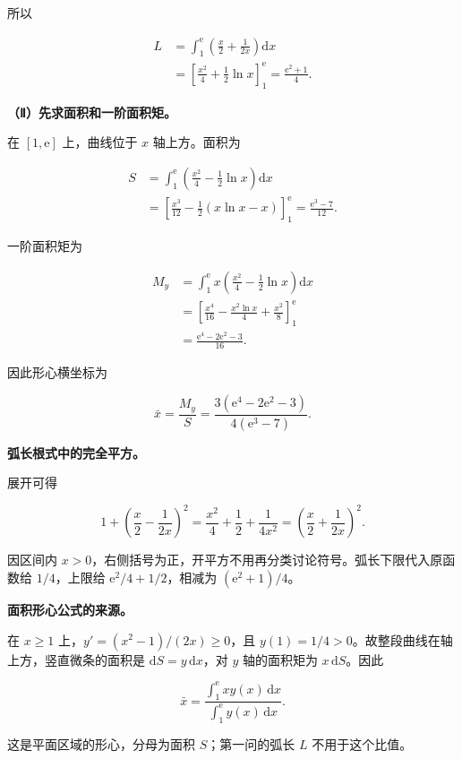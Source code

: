 \documentclass[UTF8,11pt,fontset=windows]{ctexart}
\begin{document}
所以

$$
\begin{aligned}
L&=\int_1^{\mathrm e}\left(\frac x2+\frac1{2x}\right)\mathrm dx\\
&=\left[\frac{x^2}{4}+\frac12\ln x\right]_1^{\mathrm e}
=\frac{\mathrm e^2+1}{4}.
\end{aligned}
$$

\textbf{（Ⅱ）先求面积和一阶面积矩。}

在 $[1,\mathrm e]$ 上，曲线位于 $x$ 轴上方。面积为

$$
\begin{aligned}
S&=\int_1^{\mathrm e}\left(\frac{x^2}{4}-\frac12\ln x\right)\mathrm dx\\
&=\left[\frac{x^3}{12}-\frac12(x\ln x-x)\right]_1^{\mathrm e}
=\frac{\mathrm e^3-7}{12}.
\end{aligned}
$$

一阶面积矩为

$$
\begin{aligned}
M_y&=\int_1^{\mathrm e}x\left(\frac{x^2}{4}-\frac12\ln x\right)\mathrm dx\\
&=\left[\frac{x^4}{16}-\frac{x^2\ln x}{4}+\frac{x^2}{8}\right]_1^{\mathrm e}\\
&=\frac{\mathrm e^4-2\mathrm e^2-3}{16}.
\end{aligned}
$$

因此形心横坐标为

$$
\bar x=\frac{M_y}{S}
=\frac{3(\mathrm e^4-2\mathrm e^2-3)}{4(\mathrm e^3-7)}.
$$

\textbf{弧长根式中的完全平方。}

展开可得

$$
1+\left(\frac x2-\frac1{2x}\right)^2
=\frac{x^2}{4}+\frac12+\frac1{4x^2}
=\left(\frac x2+\frac1{2x}\right)^2.
$$

因区间内 $x>0$，右侧括号为正，开平方不用再分类讨论符号。弧长下限代入原函数给 $1/4$，上限给 $\mathrm e^2/4+1/2$，相减为 $(\mathrm e^2+1)/4$。

\textbf{面积形心公式的来源。}

在 $x\ge1$ 上，$y'=(x^2-1)/(2x)\ge0$，且 $y(1)=1/4>0$。故整段曲线在轴上方，竖直微条的面积是 $\mathrm dS=y\,\mathrm dx$，对 $y$ 轴的面积矩为 $x\,\mathrm dS$。因此

$$
\bar x=\frac{\int_1^{\mathrm e}xy(x)\,\mathrm dx}
{\int_1^{\mathrm e}y(x)\,\mathrm dx}.
$$

这是平面区域的形心，分母为面积 $S$；第一问的弧长 $L$ 不用于这个比值。
\end{document}
